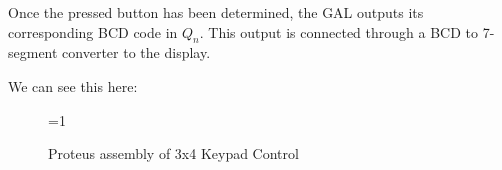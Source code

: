 Once the pressed button has been determined, the GAL outputs its corresponding BCD code in $Q_n$. This output is connected through a BCD to 7-segment converter to the display. \medskip

We can see this here:

\begin{figure}[H]
    \centering
 
    \ifnum\value{ANIMATION}=1 {
    } 
    \fi
    
    \caption{Proteus assembly of 3x4 Keypad Control}
    \label{fig:KEYPAD_PROTEUS}
\end{figure}

\clearpage





















